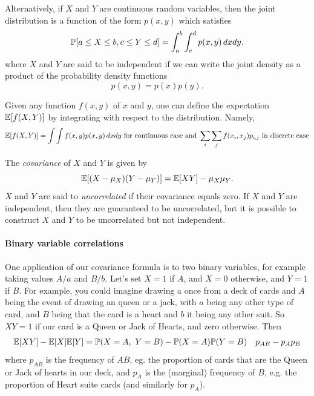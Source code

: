 Alternatively, if $X$ and $Y$ are continuous random variables, then the joint distribution is a function of the form $p(x,y)$ which satisfies 
\begin{equation}
\P[a\le X\le b, c\le Y\le d]= \int_a^b \int_c^d p(x,y)\,dxdy. 
\end{equation}
where $X$ and $Y$ are said to be independent if we can write the
joint density as a product of the probability density functions 
\begin{equation}
p(x,y) = p(x) p(y).
\end{equation}

Given any function $f(x,y)$ of $x$ and $y$, one can define the expectation $\E[f(X,Y)]$ by integrating with respect to the distribution. Namely, 
\begin{equation}
\E[f(X,Y)]=\int \int f(x,y)p(x,y)\,dxdy \mbox{ for continuous case and } \sum_i \sum_j f(x_i,x_j) p_{i,j} \mbox{ in discrete case}
\end{equation}

The \emph{covariance} of  $X$ and $Y$ is given by 
\begin{equation}
\E[(X-\mu_X)(Y-\mu_Y)]=\E[XY]-\mu_X\mu_Y. 
\end{equation}
$X$ and $Y$ are said to \emph{uncorrelated} if their covariance equals
zero. If $X$ and $Y$ are independent, then they are guaranteed to be
uncorrelated, but it is possible to construct $X$ and $Y$ to be
uncorrelated but not independent. 


\paragraph{Binary variable correlations}
One application of our covariance formula is to two binary variables,
for example taking values $A/a$ and $B/b$. Let's set $X=1$ if $A$, and
$X=0$ otherwise, and $Y=1$ if $B$.  For example, you could imagine drawing
a once from a deck of cards and $A$ being the event of drawing an
queen or a jack, with $a$ being any other type of card, and $B$ being that the card is
a heart and $b$ it being any other suit. So $XY=1$ if our card is a
Queen or Jack of Hearts, and zero otherwise. Then
\begin{eqnarray}
  \E[XY] - \E[X]\E[Y] &= \P(X=A,~Y=B) -  \P(X=A) \P(Y=B)
                        & p_{AB} - p_{A} p_{B}
 \end{eqnarray}
where $p_{AB}$ is the frequency of $AB$, eg. the proportion of cards
that are the Queen or Jack of hearts in our deck, and $p_{A}$ is the
(marginal) frequency of $B$, e.g. the proportion of Heart suite cards
(and similarly for $p_{A}$).

